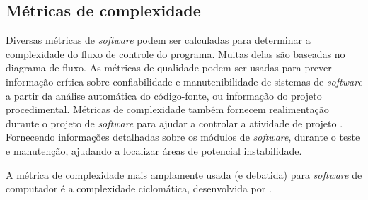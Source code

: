 \subsection{Métricas de complexidade}

Diversas métricas de \textit{software} podem ser calculadas para determinar a complexidade do fluxo de controle do programa. Muitas delas são baseadas no diagrama de fluxo.
As métricas de qualidade podem ser usadas para prever informação crítica sobre confiabilidade e manutenibilidade de sistemas de \textit{software} a partir da análise automática do código-fonte, ou informação do projeto procedimental. Métricas de complexidade também fornecem realimentação durante o projeto de \textit{software} para ajudar a controlar a atividade de projeto \cite{Pressman:2010}. Fornecendo informações detalhadas sobre os módulos de \textit{software}, durante o teste e manutenção, ajudando a localizar áreas de potencial instabilidade.

A métrica de complexidade mais amplamente usada (e debatida) para \textit{software} de computador é a complexidade ciclomática, desenvolvida por .